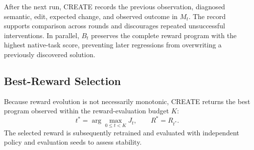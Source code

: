 After the next run, CREATE records the previous observation, diagnosed semantic, edit, expected change, and observed outcome in $M_t$. The record supports comparison across rounds and discourages repeated unsuccessful interventions. In parallel, $B_t$ preserves the complete reward program with the highest native-task score, preventing later regressions from overwriting a previously discovered solution.

\subsection{Best-Reward Selection}
Because reward evolution is not necessarily monotonic, CREATE returns the best program observed within the reward-evaluation budget $K$:
\begin{equation}
t^*=\arg\max_{0\leq t<K}J_t,\qquad R^*=R_{t^*}.
\label{eq:best_reward}
\end{equation}
The selected reward is subsequently retrained and evaluated with independent policy and evaluation seeds to assess stability.